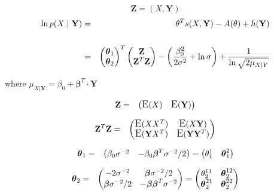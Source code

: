 \documentclass[11pt, oneside]{article}   	%
\newcommand{\bm}{\mathbf}
\newcommand{\bs}{\boldsymbol}
\DeclareMathOperator*{\E}{\mbox{\large E}}
\numberwithin{figure}{section}
\numberwithin{equation}{section}
\numberwithin{table}{section}
\theoremstyle{definition}
\begin{document}
\begin{appendices}
\begin{itemize}
$$\bm Z = ( X, \bm Y)$$
\begin{eqnarray*}
\ln p(X \mid \mathbf{Y}) &=& \theta^T s(X,\mathbf{Y}) - A(\theta) + h(\mathbf{Y})\\\\
&=&
\begin{pmatrix}
\thb_1 \\
\thb_2 \\
\end{pmatrix}^T
\begin{pmatrix}
\Z   \\
\Z^T\Z   \\
\end{pmatrix}
- \left( \frac{\beta_0^2}{2\sigma^2} + \ln{\sigma}\right)  + \frac{1}{\ln{\sqrt{2\mu_{X|Y}}}}
\end{eqnarray*}



where $\mu_{X|\bm Y} = \beta_0+ \bs \beta^T \cdot \bm Y$

\begin{eqnarray*}
\Z &=& 
\begin{pmatrix}
\E(X) & \E(\Y)
\end{pmatrix}
\end{eqnarray*}

\begin{eqnarray*}
\Z^T\Z &=& 
\begin{pmatrix}
\E(XX^T)   & \E(X\Y) \\
\E(\Y X^T) & \E(\Y \Y^T)
\end{pmatrix}
\end{eqnarray*}

\begin{eqnarray*}
\thb_1 &=& 
\begin{pmatrix}
\beta_0\sigma^{-2} & -\beta_0\beb^T\sigma^{-2}/2
\end{pmatrix}
=
\begin{pmatrix}
\theta_1^1 & \thb_1^2
\end{pmatrix}
\end{eqnarray*}

\begin{eqnarray*}
\thb_2 &=& 
\begin{pmatrix}
-2\sigma^{-2}   &  \beb \sigma^{-2}/2\\
\beb \sigma^{-2}/2   & -\beb \beb^T \sigma^{-2}
\end{pmatrix}
= 
\begin{pmatrix}
\theta_2^{11}   &  \thb_2^{12} \\
\thb_2^{21}   &  \thb_2^{22}
\end{pmatrix}
\end{eqnarray*}


\end{itemize}
\end{appendices}
\end{document}
